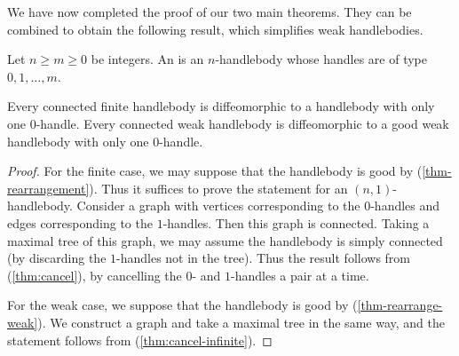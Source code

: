 We have now completed the proof of our two 
main theorems. They can be combined to obtain
the following result, which simplifies weak handlebodies.

\begin{definition}
Let $n\geq m\geq0$ be integers. An  is an $n$-handlebody
whose handles are of type $0,1,\dotsc,m$.
\end{definition}

\begin{corollary}\label{prop:0-handle}
Every connected finite handlebody is diffeomorphic to
a handlebody with only one $0$-handle.
Every connected weak handlebody is diffeomorphic to
a good weak handlebody with only one $0$-handle.
\end{corollary}

\begin{proof}
For the finite case, we may suppose that the handlebody is good by (\ref{thm-rearrangement}).
Thus it suffices to prove the statement for an $(n,1)$-handlebody.
Consider a graph with vertices corresponding to the $0$-handles
and edges corresponding to the $1$-handles.
Then this graph is connected.
Taking a maximal tree of this graph,
we may assume the handlebody is simply connected
(by discarding the $1$-handles not in the tree).
Thus the result follows from (\ref{thm:cancel}),
by cancelling the $0$- and $1$-handles a pair at a time.

For the weak case, we suppose that the handlebody is good by (\ref{thm-rearrange-weak}).
We construct a graph and take a maximal tree in the same way,
and the statement follows from (\ref{thm:cancel-infinite}).
\end{proof}
